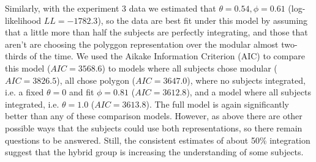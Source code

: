 \documentclass[man,10pt]{apa6}
\begin{document}
Similarly, with the experiment 3 data we estimated that $\theta = 0.54, \phi = 0.61$ (log-likelihood $LL=-1782.3$), so the data are best fit under this model by assuming that a little more than half the subjects are perfectly integrating, and those that aren't are choosing the polyggon representation over the modular almost two-thirds of the time. We used the Aikake Information Criterion (AIC) to compare this model ($AIC = 3568.6$) to models where all subjects chose modular ($AIC=3826.5$), all chose polygon ($AIC = 3647.0$), where no subjects integrated, i.e. a fixed $\theta = 0$ and fit $\phi = 0.81$ ($AIC = 3612.8$), and a model where all subjects integrated, i.e. $\theta = 1.0$ ($AIC = 3613.8$). The full model is again significantly better than any of these comparison models. However, as above there are other possible ways that the subjects could use both representations, so there remain questions to be answered. Still, the consistent estimates of about 50\% integration suggest that the hybrid group is increasing the understanding of some subjects.\\
\end{document}
